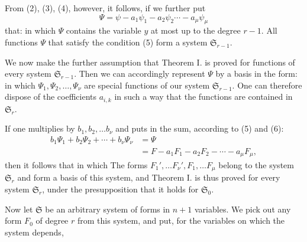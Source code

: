 From (2), (3), (4), however, it follows, if we further put
\[ \Psi = \psi - a_1\psi_1 - a_2\psi_2 \cdots - a_\mu\psi_\mu \]
that:
in which $\Psi$ contains the variable $y$ at most up to the degree $r-1$. All functions $\Psi$ that satisfy the condition (5) form a system $\mathfrak S_{r-1}$.

We now make the further assumption that Theorem I. is proved for functions of every system $\mathfrak S_{r-1}$. Then we can accordingly represent $\Psi$ by a basis in the form:
in which $\Psi_1,\Psi_2,\ldots,\Psi_\nu$ are special functions of our system $\mathfrak S_{r-1}$. One can therefore dispose of the coefficients $a_{i,k}$ in such a way that the functions
are contained in $\mathfrak S_r$.

If one multiplies by $b_1,b_2,\ldots b_\nu$ and puts in the sum, according to (5) and (6):
\[ \begin{aligned}
b_1\Psi_1+b_2\Psi_2+\cdots+b_\nu\Psi_\nu &= \Psi\\
&= F - a_1F_1-a_2F_2-\cdots-a_\mu F_\mu,
\end{aligned} \]
then it follows that
in which
The forms $F_1',\ldots F_\nu', F_1,\ldots F_\mu$ belong to the system $\mathfrak S_r$ and form a basis of this system, and Theorem I. is thus proved for every system $\mathfrak S_r$, under the presupposition that it holds for $\mathfrak S_0$.

Now let $\mathfrak S$ be an arbitrary system of forms in $n+1$ variables. We pick out any form $F_0$ of degree $r$ from this system, and put, for the variables on which the system depends,
